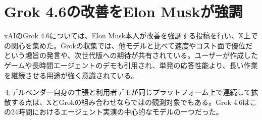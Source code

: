 \section{Grok 4.6の改善をElon Muskが強調}

xAIのGrok 4.6については、Elon Musk本人が改善を強調する投稿を行い、X上での関心を集めた。Grokの収集では、他モデルと比べて速度やコスト面で優位だという趣旨の発言や、次世代版への期待が共有されている。ユーザーが作成したゲームや長時間エージェントのデモも引用され、単発の応答性能より、長い作業を継続させる用途が強く意識されている。

モデルベンダー自身の主張と利用者デモが同じプラットフォーム上で連続して拡散する点は、XとGrokの組み合わせならではの観測対象でもある。Grok 4.6はこの24時間におけるエージェント実演の中心的なモデルの一つだった。
